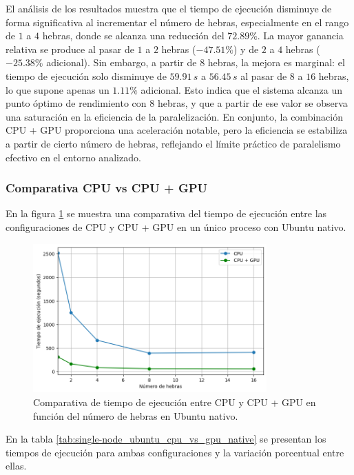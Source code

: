 El análisis de los resultados muestra que el tiempo de ejecución disminuye de forma significativa al incrementar el número de hebras, especialmente en el rango de $1$ a $4$ hebras, donde se alcanza una reducción del $72.89\%$. La mayor ganancia relativa se produce al pasar de $1$ a $2$ hebras ($-47.51\%$) y de $2$ a $4$ hebras ($-25.38\%$ adicional). Sin embargo, a partir de $8$ hebras, la mejora es marginal: el tiempo de ejecución solo disminuye de $59.91\,s$ a $56.45\,s$ al pasar de $8$ a $16$ hebras, lo que supone apenas un $1.11\%$ adicional. Esto indica que el sistema alcanza un punto óptimo de rendimiento con $8$ hebras, y que a partir de ese valor se observa una saturación en la eficiencia de la paralelización. En conjunto, la combinación CPU + GPU proporciona una aceleración notable, pero la eficiencia se estabiliza a partir de cierto número de hebras, reflejando el límite práctico de paralelismo efectivo en el entorno analizado.

\subsubsection{Comparativa CPU vs CPU + GPU}

En la figura \ref{fig:single-node_ubuntu_cpu_vs_gpu_native_time} se muestra una comparativa del tiempo de ejecución entre las configuraciones de CPU y CPU + GPU en un único proceso con Ubuntu nativo.

\begin{figure}[H]
    \centering
    \includegraphics[width=0.8\textwidth]{imagenes/cap5/single-node_ubuntu_cpu_vs_gpu_native_time.png}
    \caption{Comparativa de tiempo de ejecución entre CPU y CPU + GPU en función del número de hebras en Ubuntu nativo.}
    \label{fig:single-node_ubuntu_cpu_vs_gpu_native_time}
\end{figure}

En la tabla \ref{tab:single-node_ubuntu_cpu_vs_gpu_native} se presentan los tiempos de ejecución para ambas configuraciones y la variación porcentual entre ellas.

